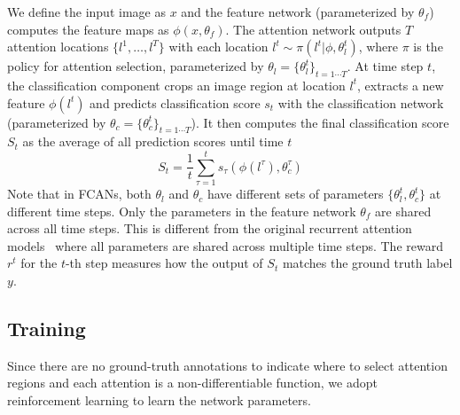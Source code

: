 \documentclass[10pt,twocolumn,letterpaper]{article}
\begin{document}
We define the input image as $x$ and the feature network (parameterized by $\theta_f$) computes the feature maps as $\phi(x, \theta_f)$.
The attention network outputs $T$ attention locations $\{l^1, \ldots, l^T\}$ with each location $l^t \sim \pi(l^t | \phi, \theta^t_l)$, where $\pi$ is the policy for attention selection, parameterized by $\theta_l=\{\theta^t_l\}_{t=1\cdots T}$.
At time step $t$, the classification component crops an image region at location $l^t$, extracts a new feature $\phi(l^t)$ and predicts classification score $s_t$ with the classification network (parameterized by $\theta_c=\{\theta^t_c\}_{t=1\cdots T}$).
It then computes the final classification score $S_t$ as the average of all prediction scores until time $t$
\begin{equation}
S_t = \frac{1}{t} \sum_{\tau=1}^t s_{\tau}(\phi(l^{\tau}), \theta^{\tau}_c)
\end{equation}
Note that in FCANs, both $\theta_l$ and $\theta_c$ have different sets of parameters $\{\theta^t_l, \theta^t_c\}$ at different time steps.
Only the parameters in the feature network $\theta_f$ are shared across all time steps.
This is different from the original recurrent attention models~\cite{mnih2014recurrent, ba2014multiple} where all parameters are shared across multiple time steps.
The reward $r^t$ for the $t$-th step measures how the output of $S_t$ matches the ground truth label $y$.






\subsection{Training}

Since there are no ground-truth annotations to indicate where to select attention regions and each attention is a non-differentiable function, we adopt reinforcement learning to learn the network parameters.
\end{document}
